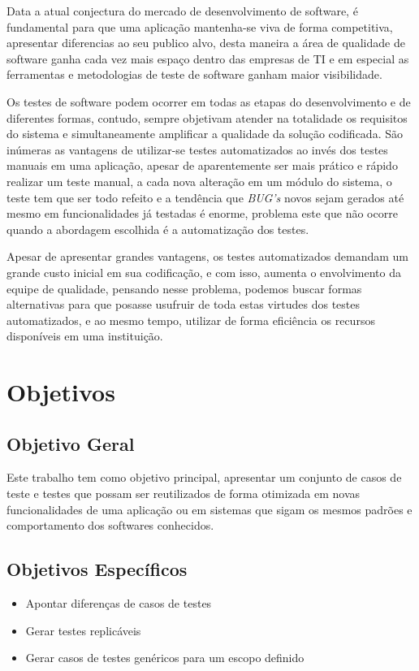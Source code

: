\documentclass[12pt]{article}
\begin{document}
	Data a atual conjectura do mercado de desenvolvimento de software, é fundamental para
	que uma aplicação mantenha-se viva de forma competitiva, apresentar diferencias ao seu publico alvo, desta
	maneira a área de qualidade de software ganha cada vez mais espaço dentro das empresas de TI e em especial as ferramentas e
	metodologias de teste de software ganham maior visibilidade.
	
	Os testes de software podem ocorrer em todas as etapas do desenvolvimento e de diferentes formas, contudo,
	sempre objetivam atender na totalidade os requisitos do sistema e simultaneamente amplificar a qualidade da solução
	codificada. São inúmeras as vantagens de utilizar-se testes automatizados ao invés dos testes manuais em uma aplicação,
	apesar de aparentemente ser mais prático e rápido realizar um teste manual, a cada nova alteração em um módulo do sistema,
	o teste tem que ser todo refeito e a tendência que \emph{BUG's} novos sejam gerados até mesmo em funcionalidades já testadas é enorme,
	problema este que não ocorre quando a abordagem escolhida é a automatização dos testes.
	
	Apesar de apresentar grandes vantagens, os testes automatizados demandam um grande custo inicial em sua codificação,
	e com isso, aumenta o envolvimento da equipe de qualidade, pensando nesse problema, podemos buscar formas alternativas para
	que posasse usufruir de toda estas virtudes dos testes automatizados, e ao mesmo tempo, utilizar de forma eficiência os
	recursos disponíveis em uma instituição.
	
	\section{Objetivos}
	
	\subsection{Objetivo Geral}
	
	Este trabalho tem como objetivo principal, apresentar um conjunto de casos de teste e testes que possam ser reutilizados de
	forma otimizada em novas funcionalidades de uma aplicação ou em sistemas que sigam os mesmos padrões e comportamento dos
	softwares conhecidos.
	
	\subsection{Objetivos Específicos}
	\begin{itemize}
		\item Apontar diferenças de casos de testes
		\item Gerar testes replicáveis
		\item Gerar casos de testes genéricos para um escopo definido
	\end{itemize}
	
\end{document}
